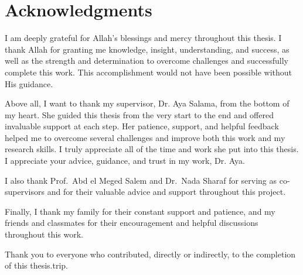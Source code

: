 \chapter*{Acknowledgments}
\label{chap:ack}
\pagestyle{plain}

I am deeply grateful for Allah’s blessings and mercy throughout this thesis. I thank Allah for granting me knowledge, insight, understanding, and success, as well as the strength and determination to overcome challenges and successfully complete this work. This accomplishment would not have been possible without His guidance.

Above all, I want to thank my supervisor, Dr. Aya Salama, from the bottom of my heart. She guided this thesis from the very start to the end and offered invaluable support at each step. Her patience, support, and helpful feedback helped me to overcome several challenges and improve both this work and my research skills. I truly appreciate all of the time and work she put into this thesis. I appreciate your advice, guidance, and trust in my work, Dr. Aya.

I also thank Prof.~Abd el Meged Salem and Dr.~Nada Sharaf for serving as co-supervisors and for their valuable advice and support throughout this project.

Finally, I thank my family for their constant support and patience, and my friends and classmates for their encouragement and helpful discussions throughout this work.

Thank you to everyone who contributed, directly or indirectly, to the completion of this thesis.trip.

